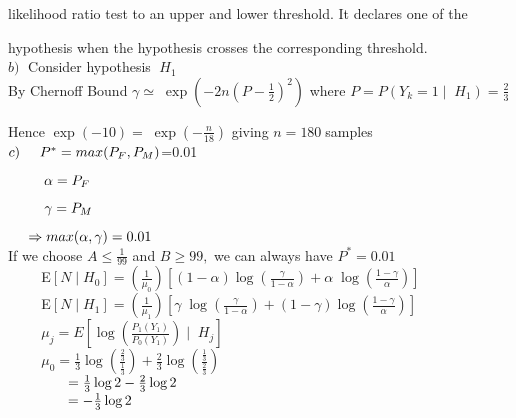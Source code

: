 \documentclass[]{article}
\begin{document}
likelihood ratio test to an upper and lower threshold. It declares one of the 

hypothesis when the hypothesis crosses the corresponding threshold.\\


$b)\;$ Consider hypothesis $\;H_1$\\


By Chernoff Bound 
$\gamma \simeq\;\exp(-2n(P-\frac{1}{2})^{2})
$ where $P=P(Y_k=1\mid\;H_1)=\frac{2}{3}$

Hence $\exp(-10) = \;\exp(-\frac{n}{18})$ giving $n = 180 \;$samples\\

$ c)\hspace{0.5cm}P^{*}=max(P_{F},P_{M})$=0.01


$\hspace{0.9cm}\alpha=P_{F}$

$\hspace{0.9cm}\gamma=P_{M}$

$\hspace{0.5cm}\Rightarrow max(\alpha,\gamma)=0.01$\\



If we choose $A\leq\frac{1}{99}$ and $B\geq99,$ we can always have $P^{*}=0.01$\\

$\hspace{1cm}$E$[N\mid H_0]= (\frac{1}{\mu_0})[(1-\alpha)\log(\frac{\gamma}{1-\alpha})+\alpha\;\log(\frac{1-\gamma}{\alpha})]$\\

$\hspace{1cm}$E$[N\mid H_1]= (\frac{1}{\mu_1})[\gamma\;\log(\frac{\gamma}{1-\alpha})+(1-\gamma)\log(\frac{1-\gamma}{\alpha})]$\\

$\hspace{1cm}$$\mu_{j}=E[\log(\frac{P_{1}(Y_{1})}{P_{0}(Y_{1})})\mid\;H_{j}]$\\

$\hspace{1cm}\mu_{0}=\frac{1}{3}\log(\frac{\frac{2}{3}}{\frac{1}{3}}) +\frac{2}{3}\log(\frac{\frac{1}{3}}{\frac{2}{3}})$\\

$\hspace{1.5cm}=\frac{1}{3}\log2 - \frac{2}{3} \log2$\\

$\hspace{1.5cm}= - \frac{1}{3} \log2$\\
\end{document}
